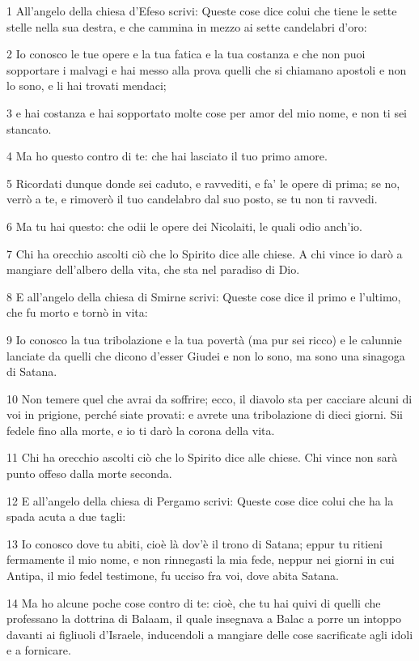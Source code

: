 \par 1 All'angelo della chiesa d'Efeso scrivi: Queste cose dice colui che tiene le sette stelle nella sua destra, e che cammina in mezzo ai sette candelabri d'oro:
\par 2 Io conosco le tue opere e la tua fatica e la tua costanza e che non puoi sopportare i malvagi e hai messo alla prova quelli che si chiamano apostoli e non lo sono, e li hai trovati mendaci;
\par 3 e hai costanza e hai sopportato molte cose per amor del mio nome, e non ti sei stancato.
\par 4 Ma ho questo contro di te: che hai lasciato il tuo primo amore.
\par 5 Ricordati dunque donde sei caduto, e ravvediti, e fa' le opere di prima; se no, verrò a te, e rimoverò il tuo candelabro dal suo posto, se tu non ti ravvedi.
\par 6 Ma tu hai questo: che odii le opere dei Nicolaiti, le quali odio anch'io.
\par 7 Chi ha orecchio ascolti ciò che lo Spirito dice alle chiese. A chi vince io darò a mangiare dell'albero della vita, che sta nel paradiso di Dio.
\par 8 E all'angelo della chiesa di Smirne scrivi: Queste cose dice il primo e l'ultimo, che fu morto e tornò in vita:
\par 9 Io conosco la tua tribolazione e la tua povertà (ma pur sei ricco) e le calunnie lanciate da quelli che dicono d'esser Giudei e non lo sono, ma sono una sinagoga di Satana.
\par 10 Non temere quel che avrai da soffrire; ecco, il diavolo sta per cacciare alcuni di voi in prigione, perché siate provati: e avrete una tribolazione di dieci giorni. Sii fedele fino alla morte, e io ti darò la corona della vita.
\par 11 Chi ha orecchio ascolti ciò che lo Spirito dice alle chiese. Chi vince non sarà punto offeso dalla morte seconda.
\par 12 E all'angelo della chiesa di Pergamo scrivi: Queste cose dice colui che ha la spada acuta a due tagli:
\par 13 Io conosco dove tu abiti, cioè là dov'è il trono di Satana; eppur tu ritieni fermamente il mio nome, e non rinnegasti la mia fede, neppur nei giorni in cui Antipa, il mio fedel testimone, fu ucciso fra voi, dove abita Satana.
\par 14 Ma ho alcune poche cose contro di te: cioè, che tu hai quivi di quelli che professano la dottrina di Balaam, il quale insegnava a Balac a porre un intoppo davanti ai figliuoli d'Israele, inducendoli a mangiare delle cose sacrificate agli idoli e a fornicare.
